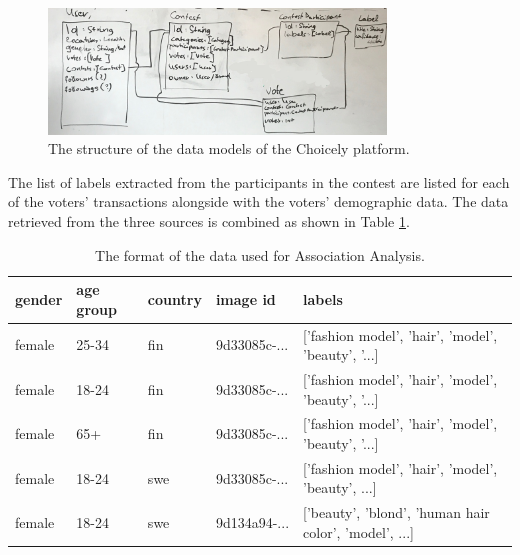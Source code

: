     \begin{figure}[h] 
		\begin{center}
            \includegraphics[width=0.8\textwidth]{Images/data_structure_whiteboard.jpg}
			\caption{The structure of the data models of the Choicely platform.}
			\label{choicely_data_models}
		\end{center}
    \end{figure}

    The list of labels extracted from the participants in the contest are listed for each of the voters' transactions alongside with the voters' demographic data. The data retrieved from the three sources is combined as shown in Table \ref{association_analyisis_data}.
    
    \begin{table}[]
        \centering
        \begin{tabular}{l|l|l|l|l}
            gender & age group & country & image id & labels \\
            \hline
            female & 25-34 & fin & 9d33085c-... & ['fashion model', 'hair', 'model', 'beauty', '...] \\
            female & 18-24 & fin & 9d33085c-... & ['fashion model', 'hair', 'model', 'beauty', '...] \\
            female & 65+ & fin & 9d33085c-... & ['fashion model', 'hair', 'model', 'beauty', '...] \\
            female & 18-24 & swe & 9d33085c-... & ['fashion model', 'hair', 'model', 'beauty', ...] \\
            female & 18-24 & swe & 9d134a94-... & ['beauty', 'blond', 'human hair color', 'model', ...]
        \end{tabular}
        \caption{The format of the data used for Association Analysis.}
        \label{association_analyisis_data}
    \end{table}